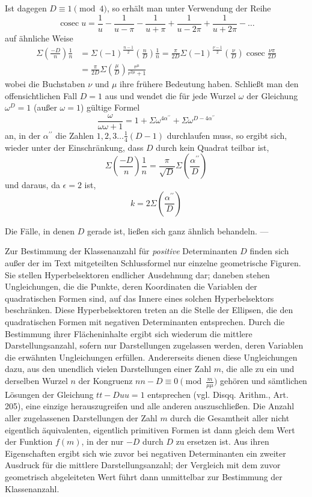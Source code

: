 Ist dagegen $D\equiv1\pmod4$, so erhält man unter Verwendung der Reihe
\[
\operatorname{cosec}u=\frac1u-\frac1{u-\pi}-\frac1{u+\pi}+\frac1{u-2\pi}+\frac1{u+2\pi}-\ldots
\]
auf ähnliche Weise
\[
\begin{aligned}
\Sigma\left(\frac{-D}n\right)\frac1n&=\Sigma(-1)^{\frac{n-1}2}\left(\frac nD\right)\frac1n
=\frac\pi{2D}\Sigma(-1)^{\frac{\nu-1}2}\left(\frac\nu D\right)\operatorname{cosec}\frac{\nu\pi}{2D}\\
&=\frac\pi{2D}\Sigma\left(\frac\mu D\right)\frac{r^\mu}{r^{2\mu}+1}
\end{aligned}
\]
wobei die Buchstaben $\nu$ und $\mu$ ihre frühere Bedeutung haben. Schließt man den offensichtlichen Fall $D=1$ aus und wendet die für jede Wurzel $\omega$ der Gleichung $\omega^D=1$ (außer $\omega=1$) gültige Formel
\[
\frac\omega{\omega\omega+1}=1+\Sigma\omega^{4\alpha^{\prime\prime}}+\Sigma\omega^{D-4\alpha^{\prime\prime}}
\]
an, in der $\alpha^{\prime\prime}$ die Zahlen $1,2,3\ldots\frac14(D-1)$ durchlaufen muss, so ergibt sich, wieder unter der Einschränkung, dass $D$ durch kein Quadrat teilbar ist,
\[
\Sigma\left(\frac{-D}n\right)\frac1n=\frac\pi{\surd D}\Sigma\left(\frac{\alpha^{\prime\prime}}D\right)
\]
und daraus, da $\epsilon=2$ ist,
\[
k=2\Sigma\left(\frac{\alpha^{\prime\prime}}D\right)
\]

Die Fälle, in denen $D$ gerade ist, ließen sich ganz ähnlich behandeln. —

Zur Bestimmung der Klassenanzahl für \emph{positive} Determinanten $D$ finden sich außer der im Text mitgeteilten Schlussformel nur einzelne geometrische Figuren. Sie stellen Hyperbelsektoren endlicher Ausdehnung dar; daneben stehen Ungleichungen, die die Punkte, deren Koordinaten die Variablen der quadratischen Formen sind, auf das Innere eines solchen Hyperbelsektors beschränken. Diese Hyperbelsektoren treten an die Stelle der Ellipsen, die den quadratischen Formen mit negativen Determinanten entsprechen. Durch die Bestimmung ihrer Flächeninhalte ergibt sich wiederum die mittlere Darstellungsanzahl, sofern nur Darstellungen zugelassen werden, deren Variablen die erwähnten Ungleichungen erfüllen. Andererseits dienen diese Ungleichungen dazu, aus den unendlich vielen Darstellungen einer Zahl $m$, die alle zu ein und derselben Wurzel $n$ der Kongruenz $nn-D\equiv0\pmod{\frac m{\mu\mu}}$ gehören und sämtlichen Lösungen der Gleichung $tt-Duu=1$ entsprechen (vgl. Disqq. Arithm., Art. 205), eine einzige herauszugreifen und alle anderen auszuschließen. Die Anzahl aller zugelassenen Darstellungen der Zahl $m$ durch die Gesamtheit aller nicht eigentlich äquivalenten, eigentlich primitiven Formen ist dann gleich dem Wert der Funktion $f(m)$, in der nur $-D$ durch $D$ zu ersetzen ist. Aus ihren Eigenschaften ergibt sich wie zuvor bei negativen Determinanten ein zweiter Ausdruck für die mittlere Darstellungsanzahl; der Vergleich mit dem zuvor geometrisch abgeleiteten Wert führt dann unmittelbar zur Bestimmung der Klassenanzahl.
\BookRule{35mm}

